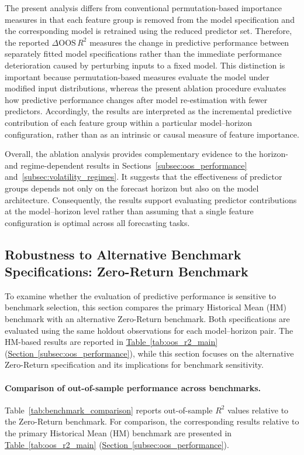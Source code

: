 \documentclass[runningheads,orivec]{llncs}
\makeatletter
\providecommand{\FloatBarrier}{\par\ifx\@deferlist\@empty\else\clearpage\fi}
\makeatother
\begin{document}
The present analysis differs from conventional permutation-based importance measures in that each feature group is removed from the model specification and the corresponding model is retrained using the reduced predictor set. Therefore, the reported $\Delta \mathrm{OOS}\,R^2$ measures the change in predictive performance between separately fitted model specifications rather than the immediate performance deterioration caused by perturbing inputs to a fixed model. This distinction is important because permutation-based measures evaluate the model under modified input distributions, whereas the present ablation procedure evaluates how predictive performance changes after model re-estimation with fewer predictors. Accordingly, the results are interpreted as the incremental predictive contribution of each feature group within a particular model--horizon configuration, rather than as an intrinsic or causal measure of feature importance.

Overall, the ablation analysis provides complementary evidence to the horizon- and regime-dependent results in Sections~\ref{subsec:oos_performance} and~\ref{subsec:volatility_regimes}. It suggests that the effectiveness of predictor groups depends not only on the forecast horizon but also on the model architecture. Consequently, the results support evaluating predictor contributions at the model--horizon level rather than assuming that a single feature configuration is optimal across all forecasting tasks.

\FloatBarrier

\subsection{Robustness to Alternative Benchmark Specifications: Zero-Return Benchmark}\label{subsec:benchmark_robustness}

To examine whether the evaluation of predictive performance is sensitive to benchmark selection, this section compares the primary Historical Mean (HM) benchmark with an alternative Zero-Return benchmark. Both specifications are evaluated using the same holdout observations for each model--horizon pair. The HM-based results are reported in \hyperref[tab:oos_r2_main]{Table~\ref*{tab:oos_r2_main}} (\hyperref[subsec:oos_performance]{Section~\ref*{subsec:oos_performance}}), while this section focuses on the alternative Zero-Return specification and its implications for benchmark sensitivity.

\paragraph{Comparison of out-of-sample performance across benchmarks.} Table~\ref{tab:benchmark_comparison} reports out-of-sample \(R^2\) values relative to the Zero-Return benchmark. For comparison, the corresponding results relative to the primary Historical Mean (HM) benchmark are presented in \hyperref[tab:oos_r2_main]{Table~\ref*{tab:oos_r2_main}} (\hyperref[subsec:oos_performance]{Section~\ref*{subsec:oos_performance}}).
\end{document}
